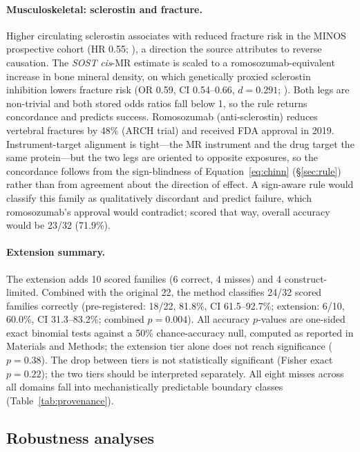 \documentclass[11pt]{article}
\begin{document}
\paragraph{Musculoskeletal: sclerostin and fracture.}
Higher circulating sclerostin associates with reduced fracture risk in the MINOS prospective cohort (HR 0.55; \cite{szulc2014}), a direction the source attributes to reverse causation. The \emph{SOST} \emph{cis}-MR estimate is scaled to a romosozumab-equivalent increase in bone mineral density, on which genetically proxied sclerostin inhibition lowers fracture risk (OR 0.59, CI 0.54--0.66, $d = 0.291$; \cite{bovijn2020}). Both legs are non-trivial and both stored odds ratios fall below 1, so the rule returns concordance and predicts success. Romosozumab (anti-sclerostin) reduces vertebral fractures by 48\% (ARCH trial) and received FDA approval in 2019. Instrument-target alignment is tight---the MR instrument and the drug target the same protein---but the two legs are oriented to opposite exposures, so the concordance follows from the sign-blindness of Equation~\ref{eq:chinn} (\S\ref{sec:rule}) rather than from agreement about the direction of effect. A sign-aware rule would classify this family as qualitatively discordant and predict failure, which romosozumab's approval would contradict; scored that way, overall accuracy would be 23/32 (71.9\%).

\paragraph{Extension summary.}
The extension adds 10 scored families (6 correct, 4 misses) and 4 construct-limited. Combined with the original 22, the method classifies 24/32 scored families correctly (pre-registered: 18/22, 81.8\%, CI 61.5--92.7\%; extension: 6/10, 60.0\%, CI 31.3--83.2\%; combined $p = 0.004$). All accuracy $p$-values are one-sided exact binomial tests against a 50\% chance-accuracy null, computed as reported in Materials and Methods; the extension tier alone does not reach significance ($p = 0.38$). The drop between tiers is not statistically significant (Fisher exact $p = 0.22$); the two tiers should be interpreted separately. All eight misses across all domains fall into mechanistically predictable boundary classes (Table~\ref{tab:provenance}).

\subsection{Robustness analyses}
\label{sec:robustness}
\end{document}
